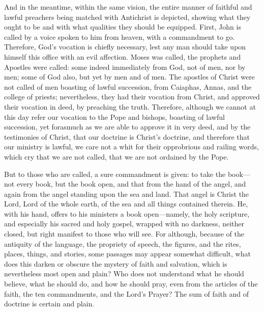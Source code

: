 And in the meantime, within the same vision, the entire manner of faithful and lawful preachers being matched with Antichrist is depicted, showing what they ought to be and with what qualities they should be equipped. First, John is called by a voice spoken to him from heaven, with a commandment to go. Therefore, God’s vocation is chiefly necessary, lest any man should take upon himself this office with an evil affection. Moses was called, the prophets and Apostles were called: some indeed immediately from God, not of men, nor by men; some of God also, but yet by men and of men. The apostles of Christ were not called of men boasting of lawful succession, from Caiaphas, Annas, and the college of priests; nevertheless, they had their vocation from Christ, and approved their vocation in deed, by preaching the truth. Therefore, although we cannot at this day refer our vocation to the Pope and bishops, boasting of lawful succession, yet forasmuch as we are able to approve it in very deed, and by the testimonies of Christ, that our doctrine is Christ’s doctrine, and therefore that our ministry is lawful, we care not a whit for their opprobrious and railing words, which cry that we are not called, that we are not ordained by the Pope.

But to those who are called, a sure commandment is given: to take the book—not every book, but the book open, and that from the hand of the angel, and again from the angel standing upon the sea and land. That angel is Christ the Lord, Lord of the whole earth, of the sea and all things contained therein. He, with his hand, offers to his ministers a book open—namely, the holy scripture, and especially his sacred and holy gospel, wrapped with no darkness, neither closed, but right manifest to those who will see. For although, because of the antiquity of the language, the propriety of speech, the figures, and the rites, places, things, and stories, some passages may appear somewhat difficult, what does this darken or obscure the mystery of faith and salvation, which is nevertheless most open and plain? Who does not understand what he should believe, what he should do, and how he should pray, even from the articles of the faith, the ten commandments, and the Lord’s Prayer? The sum of faith and of doctrine is certain and plain.

